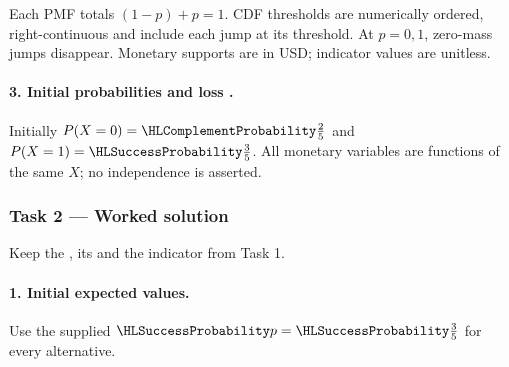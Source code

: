 Each PMF totals $(1-p)+p=1$. CDF thresholds are numerically ordered,
right-continuous and include each jump at its threshold. At $p=0,1$, zero-mass jumps disappear.
Monetary supports are in USD; indicator values are unitless.
\paragraph{3. Initial probabilities and loss \protect{}.}
Initially $P(X=0)=\FailureProb{\frac{2}{5}}$ and $P(X=1)=\SuccessProb{\frac{3}{5}}$.
All monetary variables are functions of the same $X$; no independence is asserted.
\clearpage\subsubsection*{Task 2 --- Worked solution}\label{sol:c3-manufacturing-decision}
Keep the , its  and the indicator from Task 1.
\paragraph{1. Initial expected values.}
Use the supplied $\SuccessProb{p}=\SuccessProb{\frac{3}{5}}$ for every alternative.
